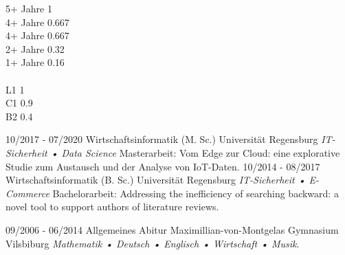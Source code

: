 
 {5+ Jahre} {1} \\[-2pt]

 {4+ Jahre} {0.667} \\[-2pt]

 {4+ Jahre} {0.667} \\[-2pt]

 {2+ Jahre} {0.32} \\[-2pt]

 {1+ Jahre} {0.16} \\[-2pt] \\

 {L1} {1} \\[-2pt]

 {C1} {0.9} \\[-2pt]

 {B2} {0.4} \\[-2pt]

\newpage

\cvmetaevent
{10/2017 - 07/2020}
{Wirtschaftsinformatik (M. Sc.)}
{Universität Regensburg}
{\textit{IT-Sicherheit • Data Science} \newline Masterarbeit: \glqq Vom Edge zur Cloud: eine explorative Studie zum Austausch und der Analyse von IoT-Daten\grqq.}
\cvmetaevent
{10/2014 - 08/2017}
{Wirtschaftsinformatik (B. Sc.)}
{Universität Regensburg}
{\textit{IT-Sicherheit • E-Commerce} \newline Bachelorarbeit: \glqq Addressing the inefficiency of searching backward: a novel tool to support authors of literature reviews\grqq.}

\cvmetaevent
{09/2006 - 06/2014}
{Allgemeines Abitur}
{Maximillian-von-Montgelas Gymnasium Vilsbiburg}
{\textit{Mathematik • Deutsch • Englisch • Wirtschaft • Musik}.}


%

